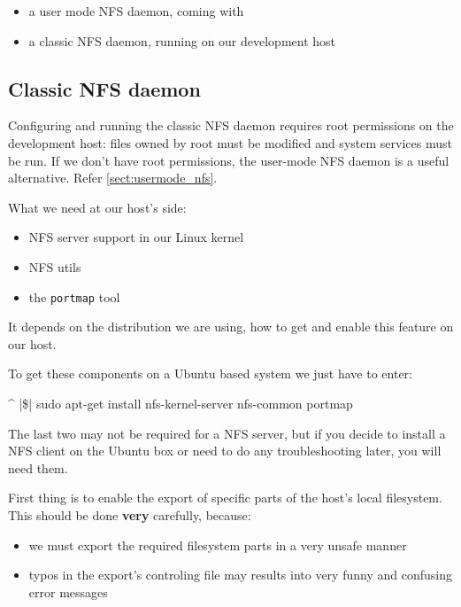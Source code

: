 \begin{itemize}
	\item a user mode NFS daemon, coming with \ptxdist{}
	\item a classic NFS daemon, running on our development host
\end{itemize}

\subsection{Classic NFS daemon}

Configuring and running the classic NFS daemon requires root permissions on the
development host: files owned by root must be modified and system services must
be run. If we don't have root permissions, the user-mode NFS daemon is a useful
alternative. Refer \ref{sect:usermode_nfs}.

What we need at our host's side:

\begin{itemize}
	\item NFS server support in our Linux kernel
	\item NFS utils
	\item the \texttt{portmap} tool
\end{itemize}

It depends on the distribution we are using, how to get and enable this feature on
our host.

To get these components on a Ubuntu based system we just have to enter:

\begin{ptxshell}[escapechar=|]{^}
|\$| sudo apt-get install nfs-kernel-server nfs-common portmap
\end{ptxshell}

The last two may not be required for a NFS server, but if you decide to install a
NFS client on the Ubuntu box or need to do any troubleshooting later, you will
need them.

First thing is to enable the export of specific parts of the host's local filesystem.
This should be done \textbf{very} carefully, because:

\begin{itemize}
	\item we must export the required filesystem parts in a very unsafe manner
	\item typos in the export's controling file may results into very funny and
		confusing error messages
\end{itemize}

